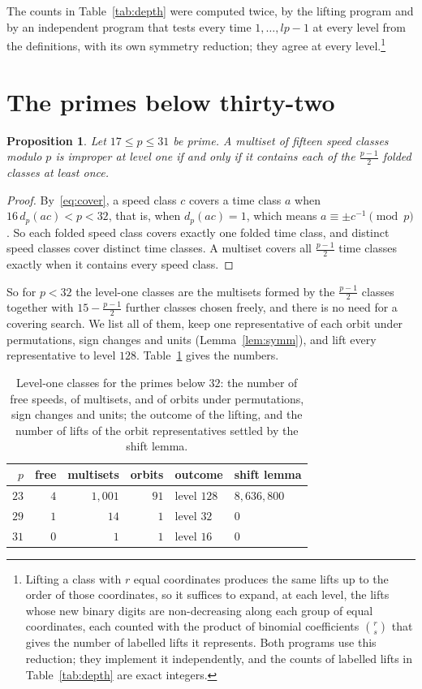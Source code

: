 \documentclass[aps,prd,twocolumn,superscriptaddress,nofootinbib,longbibliography,floatfix,showkeys,amsmath,amssymb,10pt]{revtex4-2}
\newtheorem{proposition}[theorem]{Proposition}
\theoremstyle{definition}
\theoremstyle{remark}
\begin{document}
The counts in Table~\ref{tab:depth} were computed twice, by the lifting
program and by an independent program that tests every time
$1,\dots,lp-1$ at every level from the definitions, with its own symmetry
reduction; they agree at every level.\footnote{Lifting a class with $r$
equal coordinates produces the same lifts up to the order of those
coordinates, so it suffices to expand, at each level, the lifts whose new
binary digits are non-decreasing along each group of equal coordinates,
each counted with the product of binomial coefficients $\binom{r}{s}$ that
gives the number of labelled lifts it represents. Both programs use this
reduction; they implement it independently, and the counts of labelled lifts
in Table~\ref{tab:depth} are exact integers.}

\section{The primes below thirty-two}\label{sec:small}

\begin{proposition}\label{prop:small}
Let $17\le p\le31$ be prime. A multiset of fifteen speed classes modulo $p$
is improper at level one if and only if it contains each of the
$\frac{p-1}2$ folded classes at least once.
\end{proposition}

\begin{proof}
By~\eqref{eq:cover}, a speed class $c$ covers a time class $a$ when
$16\,d_p(ac)<p<32$, that is, when $d_p(ac)=1$, which means $a\equiv\pm
c^{-1}\pmod p$. So each folded speed class covers exactly one folded time
class, and distinct speed classes cover distinct time classes. A multiset
covers all $\frac{p-1}2$ time classes exactly when it contains every speed
class.
\end{proof}

So for $p<32$ the level-one classes are the multisets formed by the
$\frac{p-1}2$ classes together with $15-\frac{p-1}2$ further classes chosen
freely, and there is no need for a covering search. We list all of them,
keep one representative of each orbit under permutations, sign changes and
units (Lemma~\ref{lem:symm}), and lift every representative to level $128$.
Table~\ref{tab:small} gives the numbers.

\begin{table}[t]
\caption{Level-one classes for the primes below $32$: the number of free
speeds, of multisets, and of orbits under permutations, sign changes and
units; the outcome of the lifting, and the number of lifts of the orbit
representatives settled by the shift lemma.}
\label{tab:small}
\centering
\small
\begin{tabular}{@{}rrrrll@{}}
\toprule
$p$ & free & multisets & orbits & outcome & shift lemma\\
\midrule
$23$ & $4$ & $1{,}001$ & $91$ & level $128$ & $8{,}636{,}800$\\
$29$ & $1$ & $14$ & $1$ & level $32$ & $0$\\
$31$ & $0$ & $1$ & $1$ & level $16$ & $0$\\
\bottomrule
\end{tabular}
\end{table}
\end{document}
